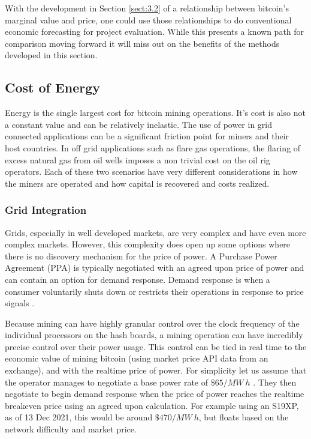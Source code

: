 \documentclass[runningheads]{llncs}
\begin{document}
With the development in Section \ref{sect:3.2} of a relationship between bitcoin's marginal value and price, one could use those relationships to do conventional economic forecasting for project evaluation.
While this presents a known path for comparison moving forward it will miss out on the benefits of the methods developed in this section. 

\subsection{Cost of Energy}
Energy is the single largest cost for bitcoin mining operations.
It's cost is also not a constant value and can be relatively inelastic.
The use of power in grid connected applications can be a significant friction point for miners and their host countries.
In off grid applications such as flare gas operations, the flaring of excess natural gas from oil wells imposes a non trivial cost on the oil rig operators.
Each of these two scenarios have very different considerations in how the miners are operated and how capital is recovered and costs realized.

\subsubsection{Grid Integration}
Grids, especially in well developed markets, are very complex and have even more complex markets.
However, this complexity does open up some options where there is no discovery mechanism for the price of power.
A Purchase Power Agreement (PPA) is typically negotiated with an agreed upon price of power and can contain an option for demand response.
Demand response is when a consumer voluntarily shuts down or restricts their operations in response to price signals \cite{iea2021demand}.

Because mining can have highly granular control over the clock frequency of the individual processors on the hash boards, a mining operation can have incredibly precise control over their power usage.
This control can be tied in real time to the economic value of mining bitcoin (using market price API data from an exchange), and with the realtime price of power.
For simplicity let us assume that the operator manages to negotiate a base power rate of $\$65/MW~h$ \cite{eia2021elect}.
They then negotiate to begin demand response when the price of power reaches the realtime breakeven price using an agreed upon calculation.
For example using an S19XP, as of 13 Dec 2021, this would be around $\$470/MW~h$, but floats based on the network difficulty and market price.
\end{document}
